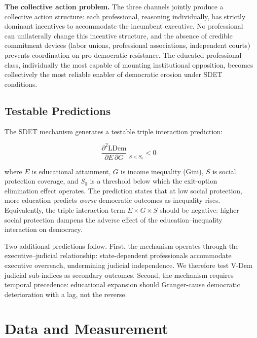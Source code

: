 \documentclass[11pt,letterpaper]{article}
\begin{document}
\textbf{The collective action problem.} The three channels jointly produce a collective action
structure: each professional, reasoning individually, has strictly dominant incentives to
accommodate the incumbent executive. No professional can unilaterally change this incentive
structure, and the absence of credible commitment devices (labor unions, professional associations,
independent courts) prevents coordination on pro-democratic resistance. The educated professional
class, individually the most capable of mounting institutional opposition, becomes collectively the
most reliable enabler of democratic erosion under SDET conditions.

\subsection{Testable Predictions}

The SDET mechanism generates a testable triple interaction prediction:

\begin{equation}
  \frac{\partial^2 \text{LDem}}{\partial E \, \partial G} \bigg|_{S < S_0} < 0
\end{equation}

where $E$ is educational attainment, $G$ is income inequality (Gini), $S$ is social protection
coverage, and $S_0$ is a threshold below which the exit-option elimination effect operates. The
prediction states that at low social protection, more education predicts \emph{worse} democratic
outcomes as inequality rises. Equivalently, the triple interaction term $E \times G \times S$
should be negative: higher social protection dampens the adverse effect of the education--inequality
interaction on democracy.

Two additional predictions follow. First, the mechanism operates through the executive--judicial
relationship: state-dependent professionals accommodate executive overreach, undermining judicial
independence. We therefore test V-Dem judicial sub-indices as secondary outcomes. Second, the
mechanism requires temporal precedence: educational expansion should Granger-cause democratic
deterioration with a lag, not the reverse.

\section{Data and Measurement}
\label{sec:data}
\end{document}
